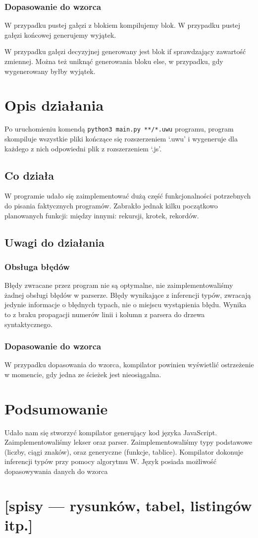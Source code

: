 \documentclass{article}
\begin{document}
\subsubsection{Dopasowanie do wzorca}
W przypadku pustej gałęzi z blokiem kompilujemy blok.
W przypadku pustej gałęzi końcowej generujemy wyjątek.


W przypadku gałęzi decyzyjnej generowany jest blok if sprawdzający zawartość zmiennej. Można też uniknąć generowania bloku else, w przypadku, gdy wygenerowany byłby wyjątek.\newpage


\section{Opis działania}
Po uruchomieniu komendą \lstinline{python3 main.py **/*.uwu} programu, program skompiluje wszystkie pliki kończące się rozszerzeniem `.uwu' i wygeneruje dla każdego z nich odpowiedni plik z rozszerzeniem `.js'.

\subsection{Co działa}
W programie udało się zaimplementować dużą część funkcjonalności potrzebnych do pisania faktycznych programów. Zabrakło jednak kilku początkowo planowanych funkcji: między innymi: rekursji, krotek, rekordów.
\subsection{Uwagi do działania}
\subsubsection{Obsługa błędów}
Błędy zwracane przez program nie są optymalne, nie zaimplementowaliśmy żadnej obsługi błędów w parserze. Błędy wynikające z inferencji typów, zwracają jedynie informacje o błędnych typach, nie o miejscu wystąpienia błędu. Wynika to z braku propagacji numerów linii i kolumn z parsera do drzewa syntaktycznego.
\subsubsection{Dopasowanie do wzorca}
W przypadku dopasowania do wzorca, kompilator powinien wyświetlić ostrzeżenie w momencie, gdy jedna ze ścieżek jest nieosiągalna.
\section*{Podsumowanie}
Udało nam się stworzyć kompilator generujący kod języka JavaScript. Zaimplementowaliśmy lekser oraz parser. Zaimplementowaliśmy typy podstawowe (liczby, ciągi znaków), oraz generyczne (funkcje, tablice). Kompilator dokonuje inferencji typów przy pomocy algorytmu W. Język posiada możliwość dopasowywania danych do wzorca 
\section{[spisy --- rysunków, tabel, listingów itp.]}




\end{document}
